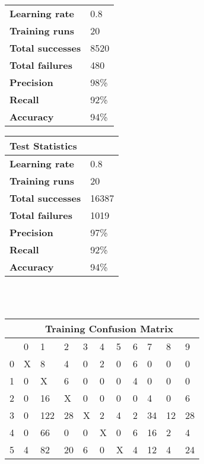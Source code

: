 \documentclass[titlepage,11pt]{article}
\begin{document}
{\begin{tabular}{l|l}
        \hline
        \textbf{Learning rate}&         0.8\\
        \textbf{Training runs}&         20\\
        \textbf{Total successes}&       8520\\
        \textbf{Total failures}&        480\\
        \textbf{Precision}&             98\%\\
        \textbf{Recall}&                92\%\\
        \textbf{Accuracy}&              94\%\\
        \end{tabular}
        \begin{tabular}{l|l}
        \textbf{Test Statistics}&\\
        \hline
        \textbf{Learning rate}&         0.8\\
        \textbf{Training runs}&         20\\
        \textbf{Total successes}&       16387\\
        \textbf{Total failures}&        1019\\
        \textbf{Precision}&             97\%\\
        \textbf{Recall}&                92\%\\
        \textbf{Accuracy}&              94\%\\
        \end{tabular}\\
        \vspace{2pt}\\
        \begin{tabular}{|l|llllllllll|}
        \hline
        &\multicolumn{10}{c|}{\textbf{Training Confusion Matrix}}\\
        \hline
        &     0&   1&   2&   3&   4&   5&   6&   7&   8&   9\\
        \hline
        0&    X&   8&   4&   0&   2&   0&   6&   0&   0&   0\\
        1&    0&   X&   6&   0&   0&   0&   4&   0&   0&   0\\
        2&    0&  16&   X&   0&   0&   0&   0&   4&   0&   6\\
        3&    0& 122&  28&   X&   2&   4&   2&  34&  12&  28\\
        4&    0&  66&   0&   0&   X&   0&   6&  16&   2&   4\\
        5&    4&  82&  20&   6&   0&   X&   4&  12&   4&  24\\

\end{tabular}}
\end{document}
